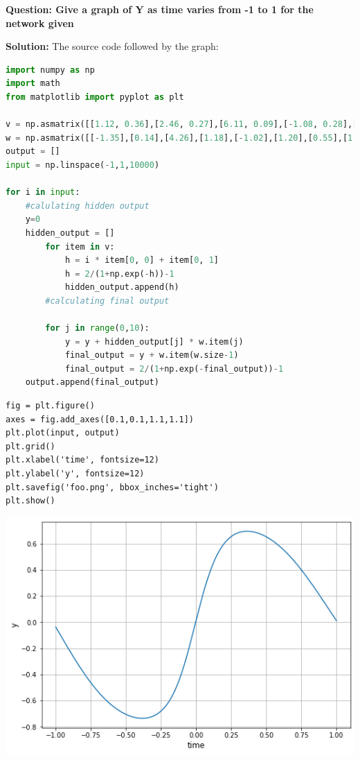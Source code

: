 \documentclass[12pt]{article}
\begin{document}
\textbf{Question: Give a graph of Y as time varies from -1 to 1 for the network given}

\BlankLine
\BlankLine

\textbf{Solution:} The source code followed by the graph:\BlankLine\BlankLine

\begin{lstlisting}[language=Python]
import numpy as np
import math
from matplotlib import pyplot as plt
	
v = np.asmatrix([[1.12, 0.36],[2.46, 0.27],[6.11, 0.09],[-1.08, 0.28],[0.96, 0.24],[-1.03, -0.29],[-0.58, 0.12],[-1.11, -0.34],[1.13,0.05],[1.05,0.06]])
w = np.asmatrix([[-1.35],[0.14],[4.26],[1.18],[-1.02],[1.20],[0.55],[1.37],[-1.27],[-1.20],[0.45]])
output = []
input = np.linspace(-1,1,10000) 
	
for i in input:
	#calulating hidden output
	y=0 
	hidden_output = [] 
		for item in v:
			h = i * item[0, 0] + item[0, 1] 
			h = 2/(1+np.exp(-h))-1 
			hidden_output.append(h)
		#calculating final output   
		
		for j in range(0,10):
			y = y + hidden_output[j] * w.item(j)
			final_output = y + w.item(w.size-1) 
			final_output = 2/(1+np.exp(-final_output))-1 
	output.append(final_output)

\end{lstlisting}

\begin{lstlisting}
fig = plt.figure()
axes = fig.add_axes([0.1,0.1,1.1,1.1]) 
plt.plot(input, output)
plt.grid()
plt.xlabel('time', fontsize=12) 
plt.ylabel('y', fontsize=12) 
plt.savefig('foo.png', bbox_inches='tight') 
plt.show()
\end{lstlisting}


	
\begin{center}
	\includegraphics{output_2_0.png}
\end{center}
\end{document}

